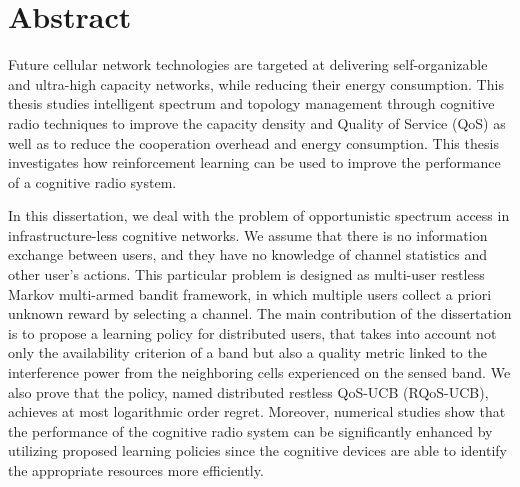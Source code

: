 %

%
%

\chapter*{Abstract} %

\mtcaddchapter %
\label{Abstract} %



Future cellular network technologies are targeted at delivering self-organizable and ultra-high capacity networks, while reducing their energy consumption. This thesis studies intelligent spectrum and topology management through cognitive radio techniques to improve the capacity density and Quality of Service (QoS) as well as to reduce the cooperation overhead and energy consumption. This thesis investigates how reinforcement learning can be used to improve the performance of a cognitive radio system. 


In this dissertation, we deal with the problem of opportunistic spectrum access in infrastructure-less cognitive networks. We assume that there is no information exchange between users, and they have no knowledge of channel statistics and other user's actions. This particular problem is designed as multi-user restless Markov multi-armed bandit framework, in which multiple users collect a priori unknown reward by selecting a channel. The main contribution of the dissertation is to propose a learning policy for distributed users, that takes into account not only the availability criterion of a band but also a quality metric linked to the interference power from the neighboring cells experienced on the sensed band. We also prove that the policy, named distributed restless QoS-UCB (RQoS-UCB), achieves at most logarithmic order regret. Moreover, numerical studies show that the performance of the cognitive radio system can be significantly enhanced by utilizing proposed learning policies since the cognitive devices are able to identify the appropriate resources more efficiently.

